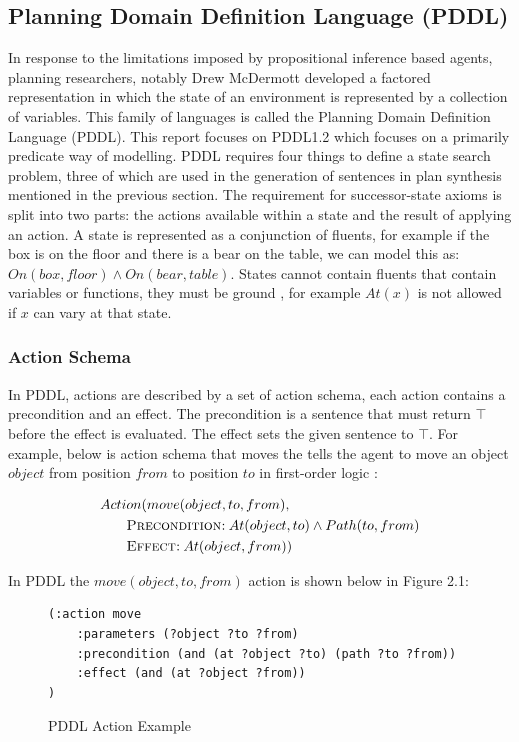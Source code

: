 \subsection{Planning Domain Definition Language (PDDL)}
In response to the limitations imposed by propositional inference based agents, planning researchers, notably Drew McDermott developed a factored representation in which the state of an environment is represented by a collection of variables. This family of languages is called the Planning Domain Definition Language (PDDL). \cite{ghallab_pddl_1998} This report focuses on PDDL1.2 which focuses on a primarily predicate way of modelling. PDDL requires four things to define a state search problem, three of which are used in the generation of sentences in plan synthesis mentioned in the previous section. The requirement for successor-state axioms is split into two parts: the actions available within a state and the result of applying an action. A state is represented as a conjunction of fluents, for example if the box is on the floor and there is a bear on the table, we can model this as: $On(box, floor) \land On(bear, table)$. States cannot contain fluents that contain variables or functions, they must be ground \cite[Chapter 10]{russell2016artificial}, for example $At(x)$ is not allowed if $x$ can vary at that state.

\subsubsection{Action Schema}
In PDDL, actions are described by a set of action schema, each action contains a precondition and an effect. The precondition is a sentence that must return $\top$ before the effect is evaluated. The effect sets the given sentence to $\top$. For example, below is action schema that moves the tells the agent to move an object $object$ from position $from$ to position $to$ in first-order logic \cite[Chapter 10]{russell2016artificial}: 

\begin{align*}
    Acti&on(move(object, to, from),\\
        &\text{\textsc{Precondition:}}\: At(object, to) \land Path(to, from)\\
        &\text{\textsc{Effect:}}\: At(object, from))
\end{align*}
\newpage

\noindent In PDDL the $move(object, to, from)$ action is shown below in Figure 2.1:

\begin{figure}[h!]
\centering
\begin{BVerbatim}
(:action move
    :parameters (?object ?to ?from)
    :precondition (and (at ?object ?to) (path ?to ?from))
    :effect (and (at ?object ?from))
)
\end{BVerbatim}
\caption{PDDL Action Example}
\end{figure}

